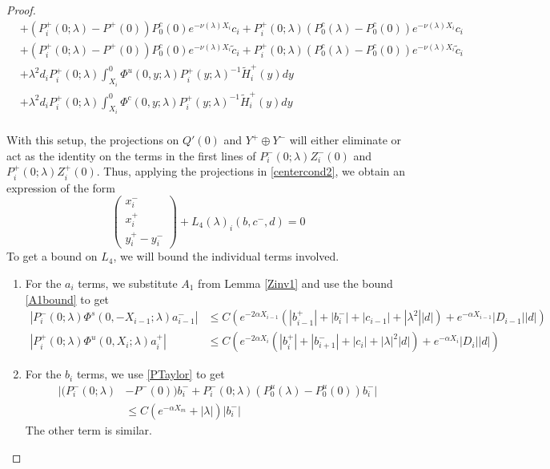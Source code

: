 \documentclass[thesis.tex]{subfiles}
\begin{document}
\begin{lemma}
\begin{proof}
\begin{align*}
&+ (P_i^+(0; \lambda) - P^+(0))P_0^c(0) e^{-\nu(\lambda)X_i} c_i + P_i^+(0; \lambda) (P_0^c(\lambda) - P_0^c(0)) e^{-\nu(\lambda)X_i} c_i \\
&+ (P_i^+(0; \lambda) - P^+(0))P_0^c(0) e^{-\nu(\lambda)X_i} \tilde{c}_i + P_i^+(0; \lambda) (P_0^c(\lambda) - P_0^c(0)) e^{-\nu(\lambda)X_i} \tilde{c}_i \\
&+ \lambda^2 d_i P_i^+(0; \lambda) \int_{X_i}^0 \Phi^u(0, y; \lambda) P_i^+(y; \lambda)^{-1} \tilde{H}_i^+(y) dy \\
&+ \lambda^2 d_i P_i^+(0; \lambda) \int_{X_i}^0 \Phi^c(0, y; \lambda) P_i^+(y; \lambda)^{-1} \tilde{H}_i^+(y) dy \\
\end{align*}

With this setup, the projections on $Q'(0)$ and $Y^+ \oplus Y^-$ will either eliminate or act as the identity on the terms in the first lines of $P_i^-(0; \lambda) Z_i^-(0)$ and $P_i^+(0; \lambda) Z_i^+(0)$. Thus, applying the projections in \eqref{centercond2}, we obtain an expression of the form
\begin{equation}\label{projxy}
\begin{pmatrix}x_i^- \\ x_i^+ \\ 
y_i^+ - y_i^- \end{pmatrix} + L_4(\lambda)_i(b, c^-, d) = 0
\end{equation}
To get a bound on $L_4$, we will bound the individual terms involved. 

\begin{enumerate}
\item For the $a_i$ terms, we substitute $A_1$ from Lemma \ref{Zinv1} and use the bound \eqref{A1bound} to get
\begin{align*}
|P_i^-(0; \lambda) \Phi^s(0, -X_{i-1}; \lambda) a_{i-1}^-| 
&\leq C \left( e^{-2 \alpha X_{i-1}} (|b_{i-1}^+| + |b_i^-| + |c_{i-1}| + |\lambda^2||d|) + e^{- \alpha X_{i-1}} |D_{i-1}||d| \right)\\
|P_i^+(0; \lambda) \Phi^u(0, X_i; \lambda) a_i^+| 
&\leq C \left( e^{-2 \alpha X_i} (|b_i^+| + |b_{i+1}^-| + |c_i| + |\lambda|^2|d|) + e^{-\alpha X_i}|D_i||d| \right)
\end{align*}

\item For the $b_i$ terms, we use \eqref{PTaylor} to get
\begin{align*}
|(P_i^-(0; \lambda) &- P^-(0))b_i^- + P_i^-(0; \lambda)(P_0^u(\lambda) - P_0^u(0))b_i^-| \\
&\leq C ( e^{-\alpha X_m} + |\lambda|)|b_i^-|
\end{align*}
The other term is similar.


\end{enumerate}
\end{proof}
\end{lemma}
\end{document}
